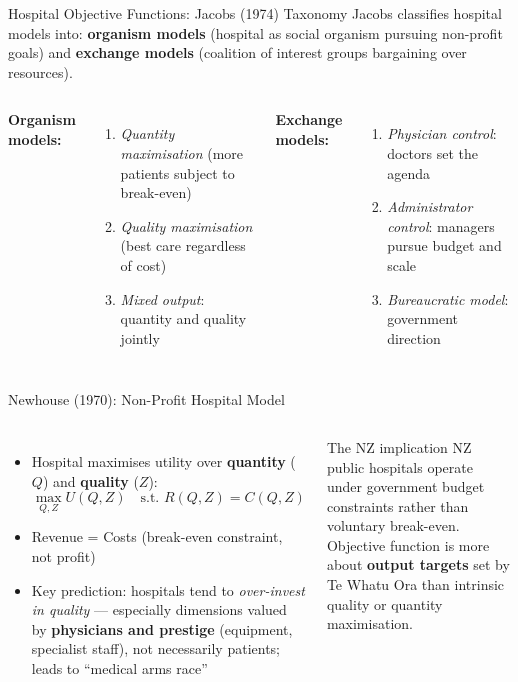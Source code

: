 \documentclass[aspectratio=169, 12pt]{beamer}
\begin{document}
\begin{frame}{Hospital Objective Functions: Jacobs (1974) Taxonomy}
  \small Jacobs classifies hospital models into: \textbf{organism models} (hospital as social organism pursuing non-profit goals) and \textbf{exchange models} (coalition of interest groups bargaining over resources).
  \begin{columns}
      \small\textbf{Organism models:}
      \begin{enumerate}\small
        \item \textit{Quantity maximisation} (more patients subject to break-even)
        \item \textit{Quality maximisation} (best care regardless of cost)
        \item \textit{Mixed output}: quantity and quality jointly
      \end{enumerate}
      \small\textbf{Exchange models:}
      \begin{enumerate}\small
        \item \textit{Physician control}: doctors set the agenda
        \item \textit{Administrator control}: managers pursue budget and scale
        \item \textit{Bureaucratic model}: government direction
      \end{enumerate}
  \end{columns}
\end{frame}

\begin{frame}{Newhouse (1970): Non-Profit Hospital Model}
  \begin{columns}
      \small
      \begin{itemize}
        \item Hospital maximises utility over \textbf{quantity} ($Q$) and \textbf{quality} ($Z$):
              \[ \max_{Q,Z} U(Q, Z) \quad \text{s.t.\ } R(Q,Z) = C(Q,Z) \]
        \item Revenue = Costs (break-even constraint, not profit)
        \item Key prediction: hospitals tend to \emph{over-invest in quality} --- especially
              dimensions valued by \textbf{physicians and prestige} (equipment, specialist
              staff), not necessarily patients; leads to ``medical arms race''
      \end{itemize}
      \begin{alertblock}{The NZ implication}
        \small NZ public hospitals operate under government budget constraints rather than
        voluntary break-even. Objective function is more about \textbf{output targets} set
        by Te Whatu Ora than intrinsic quality or quantity maximisation.
      \end{alertblock}
  \end{columns}
\end{frame}
\end{document}
